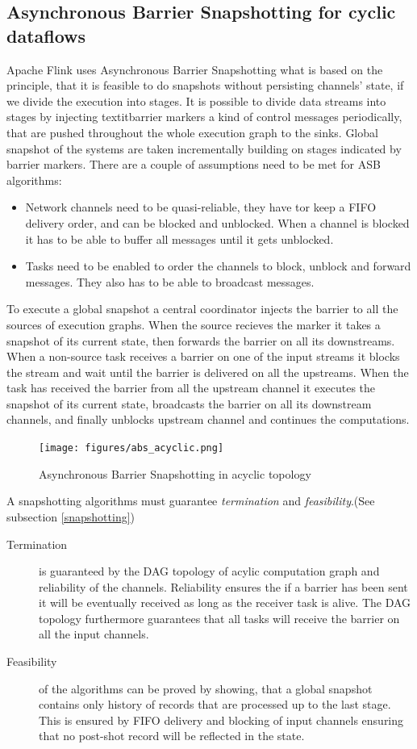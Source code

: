 \subsection{Asynchronous Barrier Snapshotting for cyclic dataflows}
Apache Flink uses Asynchronous Barrier Snapshotting what is based on the principle, that it is feasible to do snapshots without persisting channels' state, if we divide the execution into stages. 
It is possible to divide data streams into stages by injecting textit{barrier markers} a kind of control messages periodically, that are pushed throughout the whole execution graph to the sinks. Global snapshot of the systems are taken incrementally building on stages indicated by barrier markers. There are a couple of assumptions need to be met for ASB algorithms:
\begin{itemize}
\item Network channels need to be quasi-reliable, they have tor keep a FIFO delivery order, and can be blocked and unblocked. When a channel is blocked it has to be able to buffer all messages until it gets unblocked.
\item Tasks need to be enabled to order the channels to block, unblock and forward messages. They also has to be able to broadcast messages.
\end{itemize}
To execute a global snapshot a central coordinator injects the barrier to all the sources of execution graphs. When the source recieves the marker it takes  a snapshot of its current state, then forwards the barrier on all its downstreams.  When a non-source task receives a barrier on one of the input streams it blocks the stream and wait until the barrier is delivered on all the upstreams. When the task has received the barrier from all the upstream channel it executes the snapshot of its current state, broadcasts the barrier on all its downstream channels, and finally unblocks upstream channel and continues the computations.
\begin{figure}[!ht]
  \centering    
      \texttt{[image: figures/abs\_acyclic.png]}
  \caption{Asynchronous Barrier Snapshotting in acyclic topology\cite{abs}}
  \label{fig:abs_acyclic}
\end{figure}
A snapshotting algorithms must guarantee \textit{termination} and \textit{feasibility}.(See subsection \ref{snapshotting})
\begin{description}
\item[Termination] is guaranteed by the DAG topology of acylic computation graph and reliability of the channels. Reliability ensures the if a barrier has been sent it will be eventually received as long as the receiver task is alive. The DAG topology furthermore guarantees that all tasks will receive the barrier on all the input channels.
\item[Feasibility] of the algorithms can be proved by showing, that a global snapshot contains only history of records that are processed up to the last stage. This is ensured by FIFO delivery and blocking of input channels ensuring that no post-shot record will be reflected in the state. 
\end{description}
